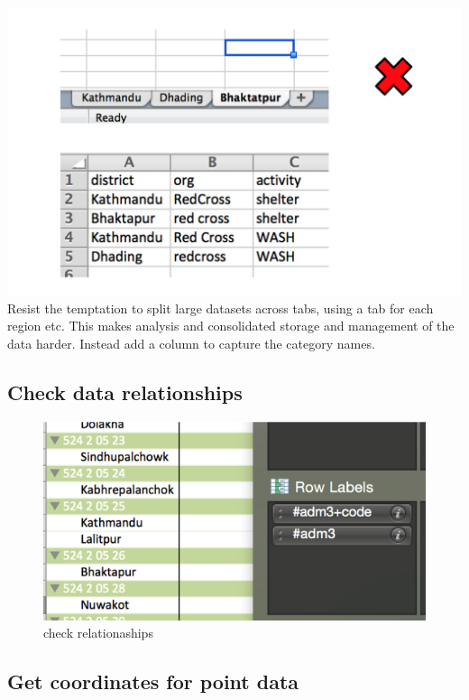 \documentclass[
  a4paper,
  onecolumn,
  oneside]{book}
\begin{document}
\includegraphics{part1/./images/1sheet.png}\\
Resist the temptation to split large datasets across tabs, using a tab
for each region etc. This makes analysis and consolidated storage and
management of the data harder. Instead add a column to capture the
category names.

\hypertarget{check-data-relationships}{%
\subsection{Check data relationships}\label{check-data-relationships}}

\begin{figure}

{\centering \includegraphics{part1/./images/checkrelationships.png}

}

\caption{check relationaships}

\end{figure}

\hypertarget{get-coordinates-for-point-data}{%
\subsection{Get coordinates for point
data}\label{get-coordinates-for-point-data}}
\end{document}
